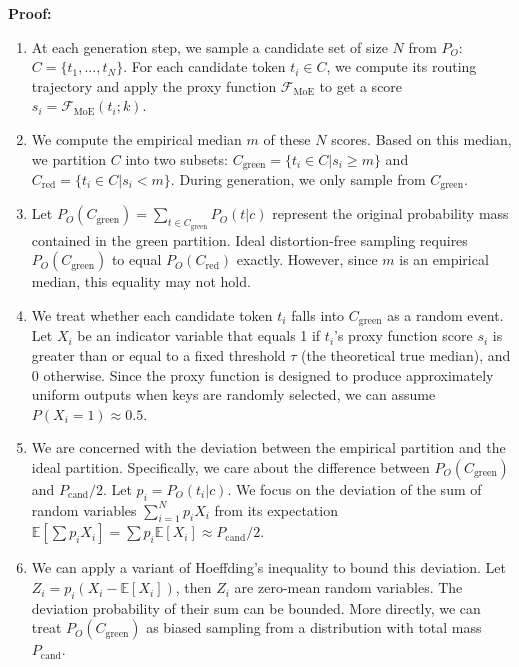 \documentclass[letterpaper,twocolumn,10pt]{article}
\begin{document}
\textbf{Proof:}

\begin{enumerate}
\item At each generation step, we sample a candidate set of size $N$ from $P_O$: $C = \{t_1,..., t_N\}$. For each candidate token $t_i \in C$, we compute its routing trajectory and apply the proxy function $\mathcal{F}_{\text{MoE}}$ to get a score $s_i = \mathcal{F}_{\text{MoE}}(t_i; k)$.

\item We compute the empirical median $m$ of these $N$ scores. Based on this median, we partition $C$ into two subsets: $C_{\text{green}} = \{t_i \in C | s_i \ge m\}$ and $C_{\text{red}} = \{t_i \in C | s_i < m\}$. During generation, we only sample from $C_{\text{green}}$.

\item Let $P_O(C_{\text{green}}) = \sum_{t \in C_{\text{green}}} P_O(t|c)$ represent the original probability mass contained in the green partition. Ideal distortion-free sampling requires $P_O(C_{\text{green}})$ to equal $P_O(C_{\text{red}})$ exactly. However, since $m$ is an empirical median, this equality may not hold.

\item We treat whether each candidate token $t_i$ falls into $C_{\text{green}}$ as a random event. Let $X_i$ be an indicator variable that equals 1 if $t_i$'s proxy function score $s_i$ is greater than or equal to a fixed threshold $\tau$ (the theoretical true median), and 0 otherwise. Since the proxy function is designed to produce approximately uniform outputs when keys are randomly selected, we can assume $P(X_i=1) \approx 0.5$.

\item We are concerned with the deviation between the empirical partition and the ideal partition. Specifically, we care about the difference between $P_O(C_{\text{green}})$ and $P_{\text{cand}}/2$. Let $p_i = P_O(t_i|c)$. We focus on the deviation of the sum of random variables $\sum_{i=1}^N p_i X_i$ from its expectation $\mathbb{E}[\sum p_i X_i] = \sum p_i \mathbb{E}[X_i] \approx P_{\text{cand}}/2$.

\item We can apply a variant of Hoeffding's inequality to bound this deviation. Let $Z_i = p_i(X_i - \mathbb{E}[X_i])$, then $Z_i$ are zero-mean random variables. The deviation probability of their sum can be bounded. More directly, we can treat $P_O(C_{\text{green}})$ as biased sampling from a distribution with total mass $P_{\text{cand}}$.


\end{enumerate}
\end{document}
